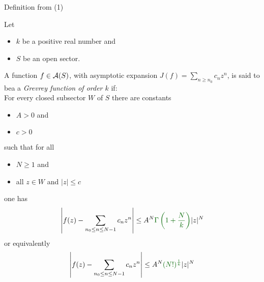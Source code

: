 {  \begin{frame}[t]{Definition from \cite{van2003galois} (1)}
    \begin{defn}[7.4]
      Let
      \begin{itemize}
        \item $k$ be a positive real number and
        \item $S$ be an open sector.
      \end{itemize}
      A function $f\in\mathcal{A}(S)$, with asymptotic expansion
      $J(f)=\sum_{n\geq n_0}c_nz^n$, is said to bea a \emph{Grevrey function of
      order $k$} if:
      \\For every closed subsector $W$ of $S$ there are constants
      \begin{itemize}
        \item $A>0$ and
        \item $c>0$
      \end{itemize}
      such that for all
      \begin{itemize}
        \item $N\geq1$ and
        \item all $z\in W$ and $|z|\leq c$
      \end{itemize}
      one has
      \[
        \left| f(z)-\sum_{n_0\leq n\leq N-1}c_nz^n \right| \leq
        A^N \textcolor{green!40!black}{\Gamma\left(1+\frac{N}{k}\right)}|z|^N
      \]
      or equivalently
      \[
        \left| f(z)-\sum_{n_0\leq n\leq N-1}c_nz^n \right|
        \leq A^N \textcolor{green!40!black}{(N!)^{\frac{1}{k}}} |z|^N
      \]
    \end{defn}
  \end{frame}

}
